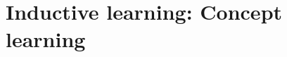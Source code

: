 \documentclass{../main.tex}[subfiles]
\begin{document}
\chapter{Inductive learning: Concept learning}
\end{document}
